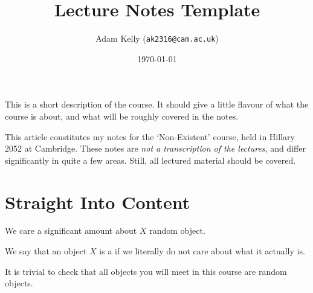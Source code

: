 \documentclass[a4paper]{scrartcl}
\title{Lecture Notes Template}
\author{Adam Kelly (\texttt{ak2316@cam.ac.uk})}
\date{\today}
\begin{document}
\maketitle

This is a short description of the course. It should give a little flavour of what the course is about, and what will be roughly covered in the notes.

This article constitutes my notes for the `Non-Existent' course, held in Hillary 2052 at Cambridge. These notes are \emph{not a transcription of the lectures}, and differ significantly in quite a few areas. Still, all lectured material should be covered.



\tableofcontents


\section{Straight Into Content} 


We care a significant amount about $X$ random object.

\begin{definition}
    We say that an object $X$ is a  if we literally do not care about what it actually is.
\end{definition}

It is trivial to check that all objects you will meet in this course are random objects.
\end{document}
